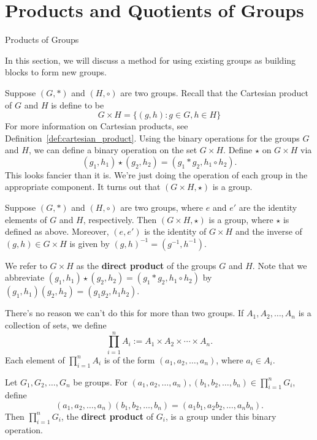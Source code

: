 \chapter{Products and Quotients of Groups}
\label{chapter:products_quotients}
\thispagestyle{empty}

\begin{section}{Products of Groups}

In this section, we will discuss a method for using existing groups as building blocks to form new groups.

Suppose $(G,*)$ and $(H,\circ)$ are two groups.  Recall that the Cartesian product of $G$ and $H$ is define to be
\[
G\times H=\{(g,h):g\in G,h\in H\}
\]
For more information on Cartesian products, see Definition~\ref{def:cartesian_product}.  Using the binary operations for the groups $G$ and $H$, we can define a binary operation on the set $G\times H$.  Define $\star$ on $G\times H$ via
\[
(g_1,h_1)\star(g_2,h_2)=(g_1*g_2,h_1\circ h_2).
\]
This looks fancier than it is.  We're just doing the operation of each group in the appropriate component.  It turns out that $(G\times H,\star)$ is a group.

\begin{theorem}
Suppose $(G,*)$ and $(H,\circ)$ are two groups, where $e$ and $e'$ are the identity elements of $G$ and $H$, respectively.   Then $(G\times H,\star)$ is a group, where $\star$ is defined as above.  Moreover, $(e,e')$ is the identity of $G\times H$ and the inverse of $(g,h)\in G\times H$ is given by $(g,h)^{-1}=(g^{-1},h^{-1})$.
\end{theorem}

We refer to $G\times H$ as the \textbf{direct product} of the groups $G$ and $H$.  Note that we abbreviate $(g_1,h_1)\star(g_2,h_2)=(g_1*g_2,h_1\circ h_2)$ by $(g_1,h_1)(g_2,h_2)=(g_1 g_2,h_1 h_2)$.

There's no reason we can't do this for more than two groups.  If $A_1, A_2, \ldots, A_n$ is a collection of sets, we define
\[
\prod_{i=1}^nA_i:=A_1\times A_2\times \cdots \times A_n.
\]
Each element of $\prod_{i=1}^nA_i$ is of the form $(a_1,a_2,\ldots, a_n)$, where $a_i\in A_i$.

\begin{theorem}
Let $G_1, G_2,\ldots, G_n$ be groups.  For $(a_1,a_2, \ldots, a_n), (b_1,b_2,\ldots, b_n)\in \prod_{i=1}^nG_i$, define
\[
(a_1,a_2, \ldots, a_n)(b_1,b_2,\ldots, b_n)=(a_1b_1,a_2b_2,\ldots, a_nb_n).
\]
Then $\prod_{i=1}^nG_i$, the \textbf{direct product} of $G_i$, is a group under this binary operation.
\end{theorem}


\end{section}

